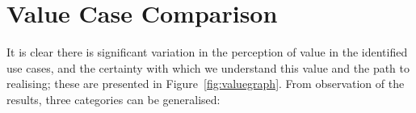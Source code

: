 \documentclass[b5paper,10pt]{article}
\begin{document}

\section{Value Case Comparison}\label{usecasecomp}


It is clear there is significant variation in the perception of value
in the identified use cases, and the certainty with which we understand
this value and the path to realising; these are presented in
Figure~\ref{fig:valuegraph}. From observation of the results, three
categories can be generalised:
\end{document}
